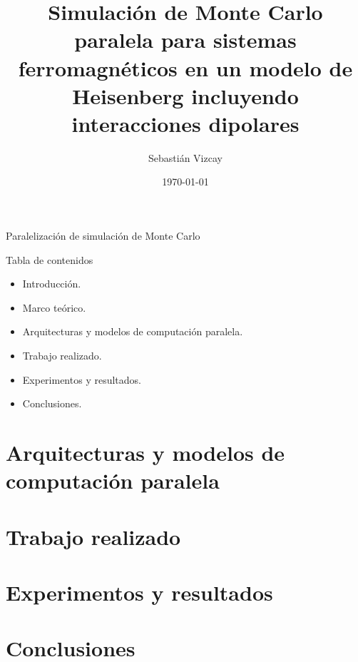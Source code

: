 \documentclass[xcolor=table]{beamer}
\author{Sebastián Vizcay}
\title{Simulación de Monte Carlo paralela para sistemas ferromagnéticos en un modelo de Heisenberg incluyendo interacciones dipolares}
\date{\today}
\begin{document}
\begin{frame}

\titlepage
\end{frame}

\begin{frame}{Paralelización de simulación de Monte Carlo}
\begin{block}{Tabla de contenidos}
\begin{itemize}
  \item Introducción.
  \item Marco teórico.
  \item Arquitecturas y modelos de computación paralela.
  \item Trabajo realizado.
  \item Experimentos y resultados.
  \item Conclusiones.
\end{itemize}
\end{block}
\end{frame}

%
%
%

\section{Arquitecturas y modelos de computación paralela}


\section{Trabajo realizado}


\section{Experimentos y resultados}


\section{Conclusiones}


\section{}

\end{document}
